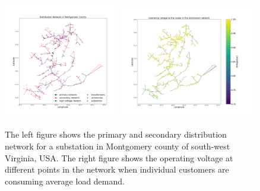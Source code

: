 \documentclass[sigconf]{acmart}
\begin{document}
\begin{figure}[htb]
	\centering
	\includegraphics[width=0.45\textwidth]{figs/24664-networktest.png}
	\includegraphics[width=0.535\textwidth]{figs/24664-voltagetest.png}
	\caption{The left figure shows the primary and secondary distribution network for a substation in Montgomery county of south-west Virginia, USA. The right figure shows the operating voltage at different points in the network when individual customers are consuming average load demand.}
	\label{fig:total}
\end{figure}
\end{document}
